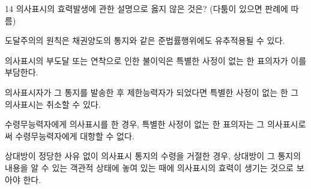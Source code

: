 \begin{question}{14}
의사표시의 효력발생에 관한 설명으로 옳지 않은 것은? (다툼이 있으면 판례에 따름)
\begin{choices}
  \item 도달주의의 원칙은 채권양도의 통지와 같은 준법률행위에도 유추적용될 수 있다.
  \item 의사표시의 부도달 또는 연착으로 인한 불이익은 특별한 사정이 없는 한 표의자가 이를 부담한다.
  \item 의사표시자가 그 통지를 발송한 후 제한능력자가 되었다면 특별한 사정이 없는 한 그 의사표시는 취소할 수 있다.
  \item 수령무능력자에게 의사표시를 한 경우, 특별한 사정이 없는 한 표의자는 그 의사표시로써 수령무능력자에게 대항할 수 없다.
  \item 상대방이 정당한 사유 없이 의사표시 통지의 수령을 거절한 경우, 상대방이 그 통지의 내용을 알 수 있는 객관적 상태에 놓여 있는 때에 의사표시의 효력이 생기는 것으로 보아야 한다.
\end{choices}
\end{question}
